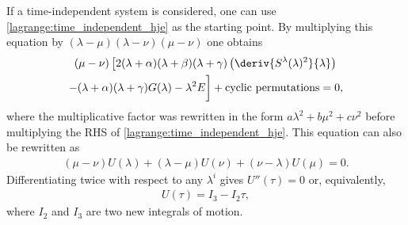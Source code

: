     If a time-independent system is considered, one can use \eqref{lagrange:time_independent_hje} as the starting point. By multiplying this equation by $(\lambda - \mu)(\lambda - \nu)(\mu - \nu)$ one obtains
    \begin{multline}
        (\mu - \nu)\left[2(\lambda + \alpha)(\lambda + \beta)(\lambda + \gamma)\left(\deriv{S^\lambda(\lambda)^2}{\lambda}\right)\right.\\ - (\lambda + \alpha)(\lambda + \gamma)G(\lambda) - \lambda^2E \bigg] + \text{cyclic permutations} = 0,
    \end{multline}
    where the multiplicative factor was rewritten in the form $a\lambda^2 + b\mu^2 + c\nu^2$ before multiplying the RHS of \eqref{lagrange:time_independent_hje}. This equation can also be rewritten as
    \begin{gather}
        (\mu-\nu)U(\lambda) + (\lambda-\mu)U(\nu) + (\nu-\lambda)U(\mu) = 0.
    \end{gather}
    Differentiating twice with respect to any $\lambda^i$ gives $U''(\tau) = 0$ or, equivalently,
    \begin{gather}
        U(\tau) = I_3 - I_2\tau,
    \end{gather}
    where $I_2$ and $I_3$ are two new integrals of motion.

